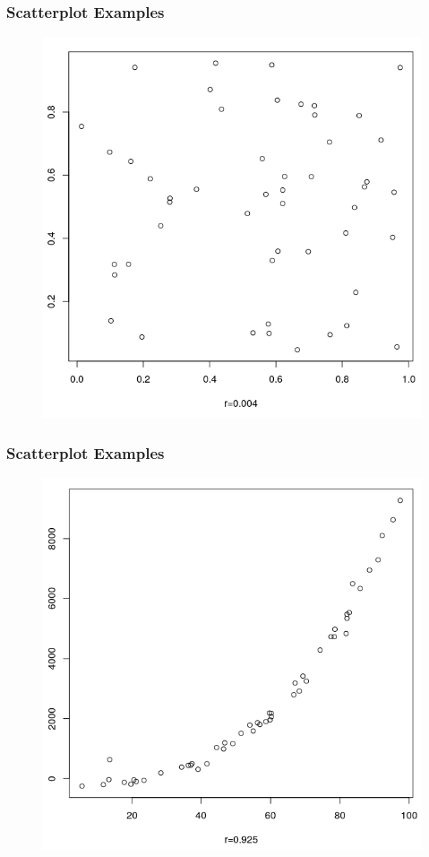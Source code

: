 \documentclass[xcolor=dvipsnames]{beamer}
\begin{document}
\begin{frame}
  \frametitle{Scatterplot Examples}
  \begin{figure}[h]
    \includegraphics[scale=0.35]{./diagrams/sc03.png}
  \end{figure}
\end{frame}

\begin{frame}
  \frametitle{Scatterplot Examples}
  \begin{figure}[h]
    \includegraphics[scale=0.35]{./diagrams/sc04.png}
  \end{figure}
\end{frame}
\end{document}
